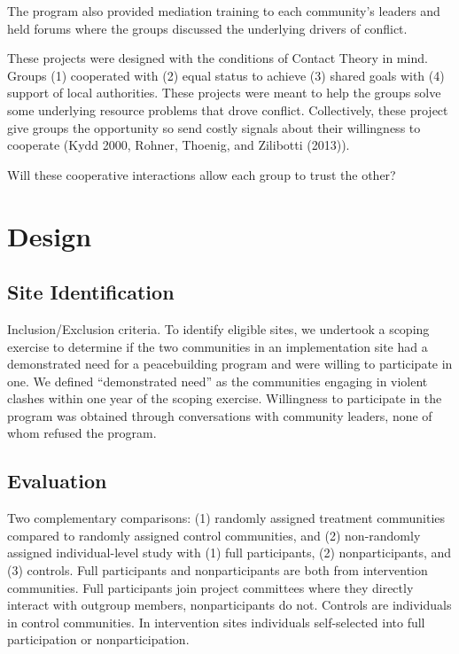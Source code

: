 \documentclass[11pt]{article}
\begin{document}
The program also provided mediation training to each community's leaders
and held forums where the groups discussed the underlying drivers of
conflict.

These projects were designed with the conditions of Contact Theory in
mind. Groups (1) cooperated with (2) equal status to achieve (3) shared
goals with (4) support of local authorities. These projects were meant
to help the groups solve some underlying resource problems that drove
conflict. Collectively, these project give groups the opportunity so
send costly signals about their willingness to cooperate (Kydd 2000,
Rohner, Thoenig, and Zilibotti (2013)).

Will these cooperative interactions allow each group to trust the other?

\section{Design}\label{design}

\subsection{Site Identification}\label{site-identification}

Inclusion/Exclusion criteria. To identify eligible sites, we undertook a
scoping exercise to determine if the two communities in an
implementation site had a demonstrated need for a peacebuilding program
and were willing to participate in one. We defined ``demonstrated need''
as the communities engaging in violent clashes within one year of the
scoping exercise. Willingness to participate in the program was obtained
through conversations with community leaders, none of whom refused the
program.

\subsection{Evaluation}\label{evaluation}

Two complementary comparisons: (1) randomly assigned treatment
communities compared to randomly assigned control communities, and (2)
non-randomly assigned individual-level study with (1) full participants,
(2) nonparticipants, and (3) controls. Full participants and
nonparticipants are both from intervention communities. Full
participants join project committees where they directly interact with
outgroup members, nonparticipants do not. Controls are individuals in
control communities. In intervention sites individuals self-selected
into full participation or nonparticipation.
\end{document}
